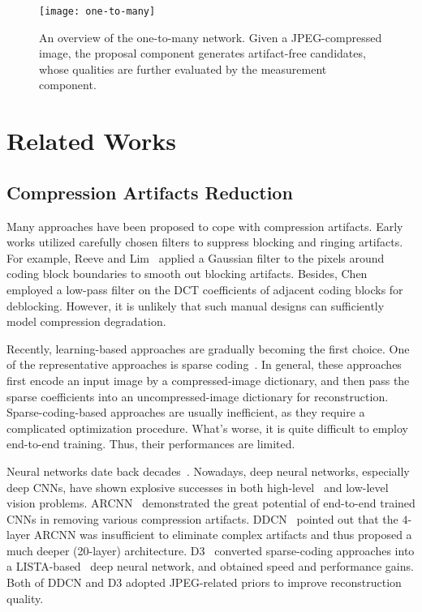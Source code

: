 \documentclass[10pt,twocolumn,letterpaper]{article}
\begin{document}
\begin{figure}[t]
\centering
\texttt{[image: one-to-many]}
\vspace{-1.9em}
\caption{An overview of the one-to-many network. Given a JPEG-compressed image, the proposal component generates artifact-free candidates, whose qualities are further evaluated by the measurement component.}
\label{fig:one-to-many}
\vspace{-1.5em}
\end{figure}

\section{Related Works}
\subsection{Compression Artifacts Reduction}
Many approaches have been proposed to cope with compression artifacts. Early works utilized carefully chosen filters to suppress blocking and ringing artifacts. For example, Reeve and Lim~\cite{reduction_of_blocking} applied a Gaussian filter to the pixels around coding block boundaries to smooth out blocking artifacts. Besides, Chen \etal~\cite{adaptive_postfiltering} employed a low-pass filter on the DCT coefficients of adjacent coding blocks for deblocking. However, it is unlikely that such manual designs can sufficiently model compression degradation.

Recently, learning-based approaches are gradually becoming the first choice. One of the representative approaches is sparse coding~\cite{image_deblocking,a_learning_based,reducing_artifacts,data_driven_sparsity,inter_block_consistent,efficient_regression_priors}. In general, these approaches first encode an input image by a compressed-image dictionary, and then pass the sparse coefficients into an uncompressed-image dictionary for reconstruction. Sparse-coding-based approaches are usually inefficient, as they require a complicated optimization procedure. What's worse, it is quite difficult to employ end-to-end training. Thus, their performances are limited.

Neural networks date back decades~\cite{lenet}. Nowadays, deep neural networks, especially deep CNNs, have shown explosive successes in both high-level~\cite{alexnet,vggnet,learning_deconvolution} and low-level~\cite{srcnn,arcnn,d3,ddcn} vision problems. ARCNN~\cite{arcnn} demonstrated the great potential of end-to-end trained CNNs in removing various compression artifacts. DDCN~\cite{ddcn} pointed out that the $4$-layer ARCNN was insufficient to eliminate complex artifacts and thus proposed a much deeper (20-layer) architecture. D3~\cite{d3} converted sparse-coding approaches into a LISTA-based~\cite{lista} deep neural network, and obtained speed and performance gains. Both of DDCN and D3 adopted JPEG-related priors to improve reconstruction quality.
\end{document}

